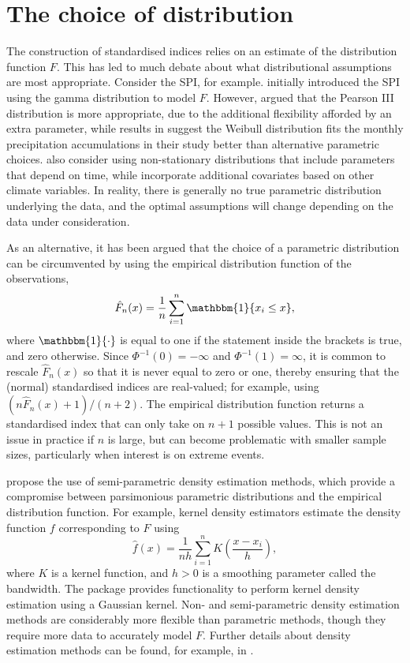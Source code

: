\documentclass[article,shortnames,nojss]{jss}\usepackage[]{graphicx}\usepackage[]{xcolor}
\newcommand{\one}{\mathbbm{1}}
\begin{document}
\section{The choice of distribution}\label{section:distribution}

The construction of standardised indices relies on an estimate of the distribution function $F$. This has led to much debate about what distributional assumptions are most appropriate. Consider the SPI, for example.  \cite{McKeeEtAl1993} initially introduced the SPI using the gamma distribution to model $F$. However, \cite{Guttman1999} argued that the Pearson III distribution is more appropriate, due to the additional flexibility afforded by an extra parameter, while results in \cite{StaggeEtAl2015} suggest the Weibull distribution fits the monthly precipitation accumulations in their study better than alternative parametric choices. \cite{RussoEtAl2013} also consider using non-stationary distributions that include parameters that depend on time, while \cite{LiEtAl2015} incorporate additional covariates based on other climate variables. In reality, there is generally no true parametric distribution underlying the data, and the optimal assumptions will change depending on the data under consideration.

As an alternative, it has been argued \citep[e.g.][]{ErhardtCzado2018,HaoEtAl2019,AllenOtero2023} that the choice of a parametric distribution can be circumvented by using the empirical distribution function of the observations,
\begin{equation}\label{eq:ecdf}
\hat{F}_{n}(x) = \frac{1}{n} \sum_{i=1}^{n} \one \{ x_{i} \leq x \},
\end{equation}
where $\one\{ \cdot \}$ is equal to one if the statement inside the brackets is true, and zero otherwise. Since $\Phi^{-1}(0) = -\infty$ and $\Phi^{-1}(1) = \infty$, it is common to rescale $\hat{F}_{n}(x)$ so that it is never equal to zero or one, thereby ensuring that the (normal) standardised indices are real-valued; for example, using $(n \hat{F}_{n}(x) + 1)/(n + 2)$. The empirical distribution function returns a standardised index that can only take on $n + 1$ possible values. This is not an issue in practice if $n$ is large, but can become problematic with smaller sample sizes, particularly when interest is on extreme events.

\cite{AllenOtero2023} propose the use of semi-parametric density estimation methods, which provide a compromise between parsimonious parametric distributions and the empirical distribution function. For example, kernel density estimators estimate the density function $f$ corresponding to $F$ using
\[
\hat{f}(x) = \frac{1}{nh} \sum_{i=1}^{n} K \left( \frac{x - x_{i}}{h} \right),
\]
where $K$ is a kernel function, and $h > 0$ is a smoothing parameter called the bandwidth. The  package provides functionality to perform kernel density estimation using a Gaussian kernel. Non- and semi-parametric density estimation methods are considerably more flexible than parametric methods, though they require more data to accurately model $F$. Further details about density estimation methods can be found, for example, in \cite{Silverman2018}.
\end{document}
